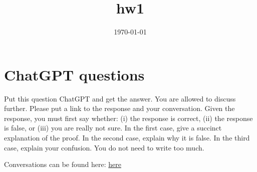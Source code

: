 \documentclass{article}
\title{hw1}
\date{\today}
\begin{document}
\maketitle

\section{ChatGPT questions} 

Put this question ChatGPT and get the answer. You are allowed to discuss further. Please put a link to the response and your conversation. 
Given the response, you must first say whether: (i) the response is correct, (ii) the response is false, or (iii) you are really not sure.
In the first case, give a succinct explanation of the proof. In the second case, explain why it is false.
In the third case, explain your confusion. You do not need to write too much.

Conversations can be found here: \href{https://github.com/splake975/ucsc-2025-2026/blob/master/fall_2025/204/duck.ai_2025-10-19_00-41-47.txt}{here}
\end{document}
